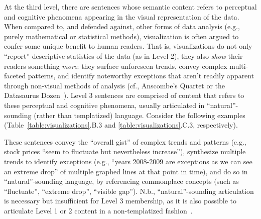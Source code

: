 At the third level, there are sentences whose semantic content refers to perceptual and cognitive phenomena appearing in the visual representation of the data.
When compared to, and defended against, other forms of data analysis (e.g., purely mathematical or statistical methods), visualization is often argued to confer some unique benefit to human readers.
That is, visualizations do not only ``report'' descriptive statistics of the data (as in Level 2), they also \emph{show} their readers something \emph{more}: they surface unforeseen trends, convey complex multi-faceted patterns, and identify noteworthy exceptions that aren't readily apparent through non-visual methods of analysis (cf., Anscombe's Quartet or the Datasaurus Dozen~\cite{matejka_same_2017}).
Level 3 sentences are comprised of content that refers to these perceptual and cognitive phenomena, usually articulated in ``natural''-sounding (rather than templatized) language.
Consider the following examples (Table~\ref{table:visualizations}.B.3 and \ref{table:visualizations}.C.3, respectively).
\begin{quote}
    \small
    \vspace{-1mm}
    \vspace{-1mm}
\end{quote}

\begin{quote}
    \small
    \vspace{-1mm}
\end{quote}

\noindent
These sentences convey the ``overall gist'' of complex trends and patterns (e.g., stock prices ``seem to fluctuate but nevertheless increase''), synthesize multiple trends to identify exceptions (e.g., ``years 2008-2009 are exceptions as we can see an extreme drop'' of multiple graphed lines at that point in time), and do so in ``natural''-sounding language, by referencing commonplace concepts (such as ``fluctuate'', ``extreme drop'', ``visible gap'').
N.b., ``natural''-sounding articulation is necessary but insufficient for Level 3 membership, as it is also possible to articulate Level 1 or 2 content in a non-templatized fashion~.

